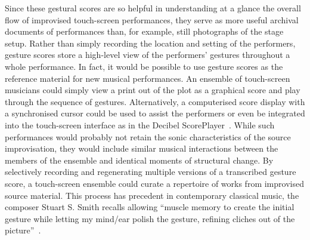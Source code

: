 \documentclass[graybox]{svmult}
\begin{document}

Since these gestural scores are so helpful in understanding at a
glance the overall flow of improvised touch-screen performances, they
serve as more useful archival documents of performances than, for
example, still photographs of the stage setup. Rather than simply
recording the location and setting of the performers, gesture scores
store a high-level view of the performers' gestures throughout a whole
performance. In fact, it would be possible to use gesture scores as
the reference material for new musical performances. An ensemble of
touch-screen musicians could simply view a print out of the plot as a
graphical score and play through the sequence of gestures.
Alternatively, a computerised score display with a synchronised cursor
could be used to assist the performers or even be integrated into the
touch-screen interface as in the Decibel
ScorePlayer~\cite{Hope:2015lr}. While such performances would probably
not retain the sonic characteristics of the source improvisation, they
would include similar musical interactions between the members of the
ensemble and identical moments of structural change. By selectively
recording and regenerating multiple versions of a transcribed gesture
score, a touch-screen ensemble could curate a repertoire of works from
improvised source material. This process has precedent in contemporary
classical music, the composer Stuart S. Smith recalls allowing
``muscle memory to create the initial gesture while letting my
mind/ear polish the gesture, refining cliches out of the
picture''~\cite{Smith:1998ff}.

\end{document}
